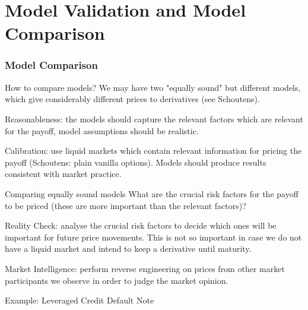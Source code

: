 
\part{Model Validation and Model Comparison}                          %


\section{Model Comparison}

{How to compare models?}
We may have two "equally sound" but different models, which give considerably different prices to derivatives (see Schoutens).







	Reasonableness: the models should capture the relevant factors which are relevant for the payoff, model assumptions should be realistic.


	Calibration: use liquid markets which contain relevant information for pricing the payoff (Schoutens: plain vanilla options). Models should produce results consistent with market practice.





{Comparing equally sound models}
What are the crucial risk factors for the payoff to be priced (these are more important than the relevant factors)?






	Reality Check: analyse the crucial risk factors to decide which ones will be important for future price movements. This is not so important in case we do not have a liquid market and intend to keep a derivative until maturity.


	Market Intelligence: perform reverse engineering on prices from other market participants we observe in order to judge the market opinion.





{Example: Leveraged Credit Default Note}






